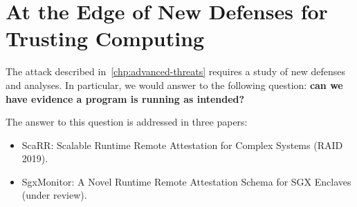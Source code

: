 \chapter{At the Edge of New Defenses for Trusting Computing} %
\label{chp:runtime-protection} 

The attack described in~\ref{chp:advanced-threats} requires a study of new
defenses and analyses. In particular, we would answer to the following 
question: \textbf{can we have evidence a program is running as intended?}

The answer to this question is addressed in three papers:
\begin{itemize}
	\item ScaRR: Scalable Runtime Remote Attestation for Complex Systems (RAID 
	2019).
	\item SgxMonitor: A Novel Runtime Remote Attestation Schema for SGX 
	Enclaves (under review).
\end{itemize}